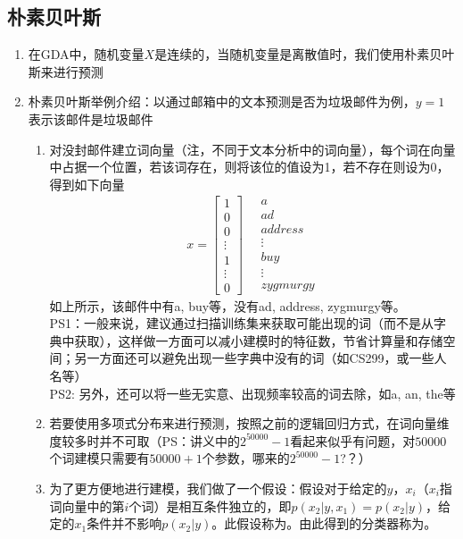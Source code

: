 \subsection{朴素贝叶斯}
\begin{enumerate}
	\item 在GDA中，随机变量$X$是连续的，当随机变量是离散值时，我们使用朴素贝叶斯来进行预测
	\item 朴素贝叶斯举例介绍：以通过邮箱中的文本预测是否为垃圾邮件为例，$y=1$表示该邮件是垃圾邮件
	\begin{enumerate}
		\item 对没封邮件建立词向量（注，不同于文本分析中的词向量），每个词在向量中占据一个位置，若该词存在，则将该位的值设为1，若不存在则设为0，得到如下向量
		\begin{align}
			x = \left[\begin{matrix}1 \\ 0 \\ 0 \\ \vdots \\ 1 \\ \vdots \\ 0 \end{matrix}\right] \quad
			\begin{matrix}a \\ ad \\ address \\ \vdots \\ buy \\ \vdots \\ zygmurgy \end{matrix}
		\end{align}
		如上所示，该邮件中有a, buy等，没有ad, address, zygmurgy等。 \\
		PS1：一般来说，建议通过扫描训练集来获取可能出现的词（而不是从字典中获取），这样做一方面可以减小建模时的特征数，节省计算量和存储空间；另一方面还可以避免出现一些字典中没有的词（如CS299，或一些人名等） \\
		PS2: 另外，还可以将一些无实意、出现频率较高的词去除，如a, an, the等
		\item 若要使用多项式分布来进行预测，按照之前的逻辑回归方式，在词向量维度较多时并不可取（PS：讲义中的$2^50000-1$看起来似乎有问题，对$50000$个词建模只需要有$50000+1$个参数，哪来的$2^50000-1$?？{\color{red}{待研究...}}）
		\item 为了更方便地进行建模，我们做了一个假设：假设对于给定的$y$，$x_i$（$x_i$指词向量中的第$i$个词）是相互条件独立的，即$p(x_2|y, x_1) = p(x_2|y)$，给定的$x_1$条件并不影响$p(x_2|y)$。此假设称为{\color{blue}{朴素贝叶斯假设}}。由此得到的分类器称为{\color{blue}{朴素贝叶斯分类器}}。

\end{enumerate}
\end{enumerate}
